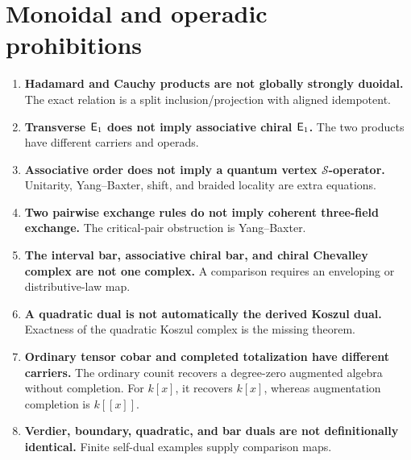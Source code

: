 \section{Monoidal and operadic prohibitions}
\begin{enumerate}[resume*=nogo,label=\textbf{N\arabic*.}]
\item \textbf{Hadamard and Cauchy products are not globally strongly duoidal.}  The exact relation is a split inclusion/projection with aligned idempotent.
\item \textbf{Transverse \(\mathsf E_1\) does not imply associative chiral \(\mathsf E_1\).}  The two products have different carriers and operads.
\item \textbf{Associative order does not imply a quantum vertex \(\mathcal S\)-operator.}  Unitarity, Yang--Baxter, shift, and braided locality are extra equations.
\item \textbf{Two pairwise exchange rules do not imply coherent three-field exchange.}  The critical-pair obstruction is Yang--Baxter.
\item \textbf{The interval bar, associative chiral bar, and chiral Chevalley complex are not one complex.}  A comparison requires an enveloping or distributive-law map.
\item \textbf{A quadratic dual is not automatically the derived Koszul dual.}  Exactness of the quadratic Koszul complex is the missing theorem.
\item \textbf{Ordinary tensor cobar and completed totalization have different carriers.} The ordinary counit recovers a degree-zero augmented algebra without completion. For $k[x]$, it recovers $k[x]$, whereas augmentation completion is $k[[x]]$.
\item \textbf{Verdier, boundary, quadratic, and bar duals are not definitionally identical.}  Finite self-dual examples supply comparison maps.
\end{enumerate}

